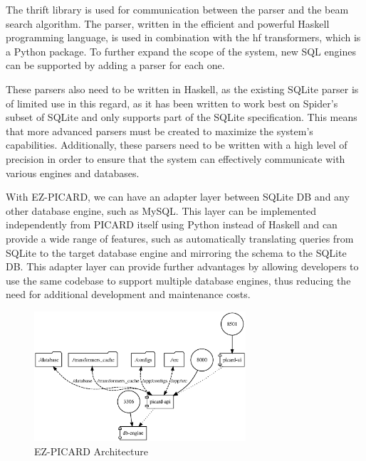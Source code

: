 
The thrift library is used for communication between the parser and the beam search algorithm. The parser, written in the efficient and powerful Haskell programming language, is used in combination with the hf transformers, which is a Python package. To further expand the scope of the system, new SQL engines can be supported by adding a parser for each one.

These parsers also need to be written in Haskell, as the existing SQLite parser is of limited use in this regard, as it has been written to work best on Spider's subset of SQLite and only supports part of the SQLite specification. This means that more advanced parsers must be created to maximize the system's capabilities. Additionally, these parsers need to be written with a high level of precision in order to ensure that the system can effectively communicate with various engines and databases.

With EZ-PICARD, we can have an adapter layer between SQLite DB and any other database engine, such as MySQL. This layer can be implemented independently from PICARD itself using Python instead of Haskell and can provide a wide range of features, such as automatically translating queries from SQLite to the target database engine and mirroring the schema to the SQLite DB. This adapter layer can provide further advantages by allowing developers to use the same codebase to support multiple database engines, thus reducing the need for additional development and maintenance costs.

\begin{figure}[H]
    \centering
    \includegraphics[width=0.7\textwidth]{pics/ez/mapeps}
    \caption{EZ-PICARD Architecture}
\end{figure}